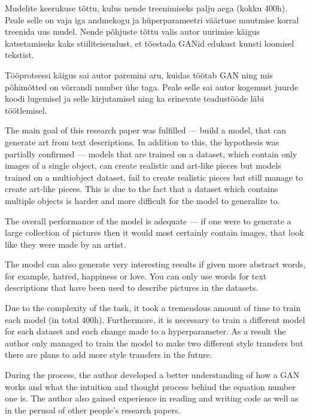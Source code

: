 \documentclass{vilgym}
\begin{document}
	Mudelite keerukuse tõttu, kulus nende treenimiseks palju aega (kokku 400h). Peale selle on vaja iga andmekogu ja hüperparameetri väärtuse muutmise korral treenida uus mudel. Nende põhjuste tõttu valis autor uurimise käigus katsetamiseks kaks stiiliteisendust, et tõestada GANid edukust kunsti loomisel tekstist.


	Tööprotsessi käigus sai autor paremini aru, kuidas töötab GAN ning mis põhimõtted on võrrandi number ühe taga. Peale selle sai autor kogemust juurde koodi lugemisel ja selle kirjutamisel ning ka erinevate teadustööde läbi töötlemisel.

    The main goal of this research paper was fulfilled --- build a model, that can generate art from text descriptions. In addition to this, the hypothesis was partially confirmed --- models that are trained on a dataset, which contain only images of a single object, can create realistic and art-like pieces but models trained on a multiobject dataset, fail to create realistic pieces but still manage to create art-like pieces. This is due to the fact that a dataset which contains multiple objects is harder and more difficult for the model to generalize to.   

    The overall performance of the model is adequate --- if one were to generate a large collection of pictures then it would most certainly contain images, that look like they were made by an artist.

    The model can also generate very interesting results if given more abstract words, for example, hatred, happiness or love. You can only use words for text descriptions that have been used to describe pictures in the datasets.

    Due to the complexity of the task, it took a tremendous amount of time to train each model (in total 400h). Furthermore, it is necessary to train a different model for each dataset and each change made to a hyperparameter. As a result the author only managed to train the model to make two different style transfers but there are plans to add more style transfers in the future.
    
    During the process, the author developed a better understanding of how a GAN works and what the intuition and thought process behind the equation number one is. The author also gained experience in reading and writing code as well as in the perusal of other people's research papers.
	\nocite{*} %
	\printbibliography[title={Kasutatud allikad}]
\end{document}
